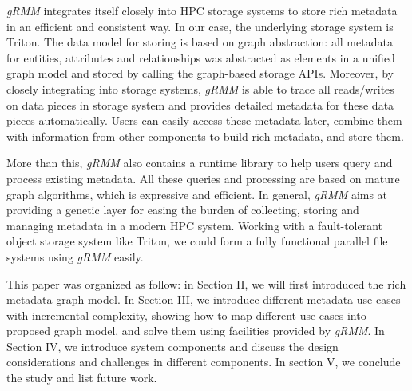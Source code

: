 \textit{gRMM} integrates itself closely into HPC storage systems to store rich metadata in an efficient and consistent way. In our case, the underlying storage system is Triton. The data model for storing is based on graph abstraction: all metadata for entities, attributes and relationships was abstracted as elements in a unified graph model and stored by calling the graph-based storage APIs. Moreover, by closely integrating into storage systems, \textit{gRMM} is able to trace all reads/writes on data pieces in storage system and provides detailed metadata for these data pieces automatically. Users can easily access these metadata later, combine them with information from other components to build rich metadata, and store them. 

More than this, \textit{gRMM} also contains a runtime library to help users query and process existing metadata. All these queries and processing are based on mature graph algorithms, which is expressive and efficient. In general, \textit{gRMM} aims at providing a genetic layer for easing the burden of collecting, storing and managing metadata in a modern HPC system. Working with a fault-tolerant object storage system like Triton, we could form a fully functional parallel file systems using \textit{gRMM} easily.

This paper was organized as follow: in Section II, we will first introduced the rich metadata graph model. In Section III, we introduce different metadata use cases with incremental complexity, showing how to map different use cases into proposed graph model, and solve them using facilities provided by \textit{gRMM}. In Section IV, we introduce system components and discuss the design considerations and challenges in different components. In section V, we conclude the study and list future work.